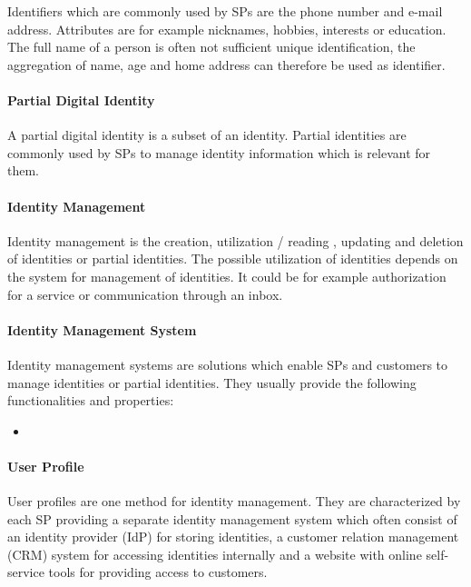 Identifiers which are commonly used by SPs are the phone number and e-mail address. Attributes are for example nicknames, hobbies, interests or education. The full name of a person is often not sufficient unique identification, the aggregation of name, age and home address can therefore be used as identifier.

\paragraph{Partial Digital Identity}
A partial digital identity is a subset of an identity. Partial identities are commonly used by SPs to manage identity information which is relevant for them. 

\paragraph{Identity Management}
Identity management is the creation, utilization / reading , updating and deletion of identities or partial identities. The possible utilization of identities depends on the system for management of identities. It could be for example authorization for a service or communication through an inbox.

\paragraph{Identity Management System}
Identity management systems are solutions which enable SPs and customers to manage identities or partial identities.
They usually provide the following functionalities and properties:
\begin{itemize}
    \item 
\end{itemize}

\paragraph{User Profile}
User profiles are one method for identity management. They are characterized by each SP providing a separate identity management system which often consist of an identity provider (IdP) for storing identities, a customer relation management (CRM) system for accessing identities internally and a website with online self-service tools for providing access to customers.
